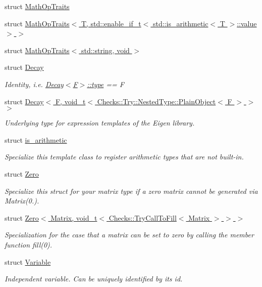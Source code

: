 \begin{DoxyCompactItemize}
struct \hyperlink{structFunG_1_1MathOpTraits}{Math\-Op\-Traits}
\item 
struct \hyperlink{structFunG_1_1MathOpTraits_3_01T_00_01std_1_1enable__if__t_3_01std_1_1is__arithmetic_3_01T_01_4_1_1value_01_4_01_4}{Math\-Op\-Traits$<$ T, std\-::enable\-\_\-if\-\_\-t$<$ std\-::is\-\_\-arithmetic$<$ T $>$\-::value $>$ $>$}
\item 
struct \hyperlink{structFunG_1_1MathOpTraits_3_01std_1_1string_00_01void_01_4}{Math\-Op\-Traits$<$ std\-::string, void $>$}
\item 
struct \hyperlink{structFunG_1_1Decay}{Decay}
\begin{DoxyCompactList}\small\item\em Identity, i.\-e. \hyperlink{structFunG_1_1Decay_a4b2916cbb7c8587ab3fccc9b896b9df4}{Decay$<$\-F$>$\-::type} == F \end{DoxyCompactList}\item 
struct \hyperlink{structFunG_1_1Decay_3_01F_00_01void__t_3_01Checks_1_1Try_1_1NestedType_1_1PlainObject_3_01F_01_4_01_4_01_4}{Decay$<$ F, void\-\_\-t$<$ Checks\-::\-Try\-::\-Nested\-Type\-::\-Plain\-Object$<$ F $>$ $>$ $>$}
\begin{DoxyCompactList}\small\item\em Underlying type for expression templates of the Eigen library. \end{DoxyCompactList}\item 
struct \hyperlink{structFunG_1_1is__arithmetic}{is\-\_\-arithmetic}
\begin{DoxyCompactList}\small\item\em Specialize this template class to register arithmetic types that are not built-\/in. \end{DoxyCompactList}\item 
struct \hyperlink{structFunG_1_1Zero}{Zero}
\begin{DoxyCompactList}\small\item\em Specialize this struct for your matrix type if a zero matrix cannot be generated via Matrix(0.). \end{DoxyCompactList}\item 
struct \hyperlink{structFunG_1_1Zero_3_01Matrix_00_01void__t_3_01Checks_1_1TryCallToFill_3_01Matrix_01_4_01_4_01_4}{Zero$<$ Matrix, void\-\_\-t$<$ Checks\-::\-Try\-Call\-To\-Fill$<$ Matrix $>$ $>$ $>$}
\begin{DoxyCompactList}\small\item\em Specialization for the case that a matrix can be set to zero by calling the member function fill(0). \end{DoxyCompactList}\item 
struct \hyperlink{structFunG_1_1Variable}{Variable}
\begin{DoxyCompactList}\small\item\em Independent variable. Can be uniquely identified by its id. \end{DoxyCompactList}\end{DoxyCompactItemize}
